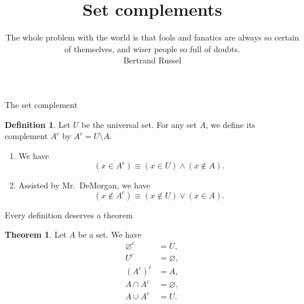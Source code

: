 \documentclass[fleqn]{beamer}
\subtitle{%
The whole problem with the world is that fools and fanatics are always so certain of themselves, and wiser people so full of doubts. \\ \vspace{0.25in} Bertrand Russel}
\title{\textbf{Set complements}}
\date{}
\theoremstyle{definition}
\newtheorem{mydef}{Definition}
\newtheorem{myth}{Theorem}
\newenvironment{checklist}{
  \begin{enumerate}[\ding{51}]
    \addtolength{\itemsep}{-0.0\itemsep}}
  {\end{enumerate}}
\begin{document}
\frame{\titlepage}

\begin{frame}{The set complement}

\begin{mydef}  Let \( U \) be the universal set. For any set \(A\), we define its complement \(A^c\) by \(A^c = U  \setminus A\).

\end{mydef}


\begin{checklist}

\item We have
\[
     (x \in A^c)  \equiv   (x \in U)    \land  (x \notin A)  .
\]

\item Assisted by Mr.\  DeMorgan, we have
\[
     (x \notin A^c)  \equiv   (x \notin U)    \lor   (x  \in A)  .
\]


\end{checklist}
\end{frame}


\begin{frame}{Every definition deserves a theorem}


\begin{myth} Let \(A\) be a set.  We have
\begin{align*}
    \varnothing^c &= U, \\
    U^c  &= \varnothing, \\
    (A^c)^c & = A, \\
      A \cap A^c &= \varnothing, \\
       A \cup A^c &=  U.
\end{align*}

\end{myth}
\end{frame}
\end{document}
